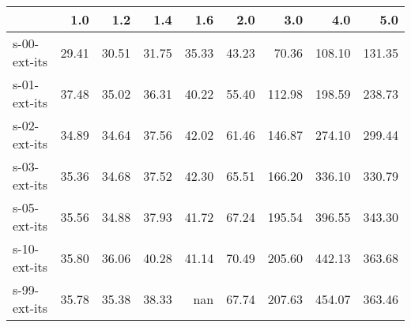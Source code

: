 \begin{tabular}{lrrrrrrrr}
\toprule
{} &   1.0 &   1.2 &   1.4 &   1.6 &   2.0 &    3.0 &    4.0 &    5.0 \\
\midrule
s-00-ext-its & 29.41 & 30.51 & 31.75 & 35.33 & 43.23 &  70.36 & 108.10 & 131.35 \\
s-01-ext-its & 37.48 & 35.02 & 36.31 & 40.22 & 55.40 & 112.98 & 198.59 & 238.73 \\
s-02-ext-its & 34.89 & 34.64 & 37.56 & 42.02 & 61.46 & 146.87 & 274.10 & 299.44 \\
s-03-ext-its & 35.36 & 34.68 & 37.52 & 42.30 & 65.51 & 166.20 & 336.10 & 330.79 \\
s-05-ext-its & 35.56 & 34.88 & 37.93 & 41.72 & 67.24 & 195.54 & 396.55 & 343.30 \\
s-10-ext-its & 35.80 & 36.06 & 40.28 & 41.14 & 70.49 & 205.60 & 442.13 & 363.68 \\
s-99-ext-its & 35.78 & 35.38 & 38.33 &   nan & 67.74 & 207.63 & 454.07 & 363.46 \\
\bottomrule
\end{tabular}
